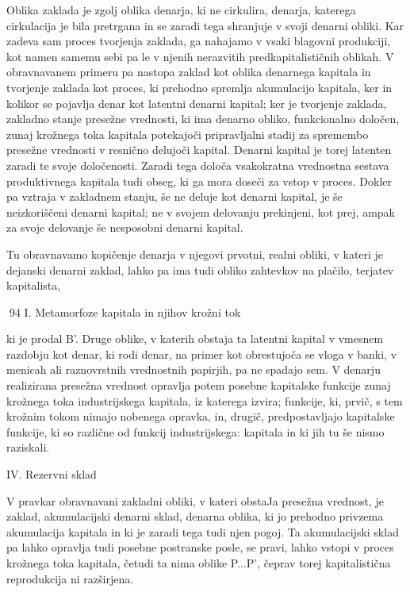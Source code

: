 \documentclass[kapital_02.tex]{subfiles}
\begin{document}
Oblika zaklada je zgolj oblika denarja, ki ne cirkulira, denarja, katerega cirkulacija je bila pretrgana in se zaradi tega shranjuje v svoji denarni obliki. Kar zadeva sam proces tvorjenja zaklada, ga nahajamo v vsaki blagovni produkciji, kot namen samemu sebi pa le v njenih nerazvitih predkapitalističnih oblikah. V obravnavanem primeru pa nastopa zaklad kot oblika denarnega kapitala in tvorjenje zaklada kot proces, ki prehodno spremlja akumulacijo kapitala, ker in kolikor se pojavlja denar kot latentni denarni kapital; ker je tvorjenje zaklada, zakladno stanje presežne vrednosti, ki ima denarno obliko, funkcionalno določen, zunaj krožnega toka kapitala potekajoči pripravljalni stadij za spremembo presežne vrednosti v resnično delujoči kapital. Denarni kapital je torej latenten zaradi te svoje določenosti. Zaradi tega določa vsakokratna vrednostna sestava produktivnega kapitala tudi obseg, ki ga mora doseči za vstop v proces. Dokler pa vztraja v zakladnem stanju, še ne deluje kot denarni kapital, je še neizkoriščeni denarni kapital; ne v svojem delovanju prekinjeni, kot prej, ampak za svoje delovanje še nesposobni denarni kapital.

Tu obravnavamo kopičenje denarja v njegovi prvotni, realni obliki, v kateri je dejanski denarni zaklad, lahko pa ima tudi obliko zahtevkov na plačilo, terjatev kapitalista,



94 I. Metamorfoze kapitala in njihov krožni tok



 ki je prodal B'. Druge oblike, v katerih obstaja ta latentni kapital v vmesnem razdobju kot denar, ki rodi denar, na primer kot obrestujoča se vloga v banki, v menicah ali raznovrstnih vrednostnih papirjih, pa ne spadajo sem. V denarju realizirana presežna vrednost opravlja potem posebne kapitalske funkcije zunaj krožnega toka industrijskega kapitala, iz katerega izvira; funkcije, ki, prvič, s tem krožnim tokom nimajo nobenega opravka, in, drugič, predpostavljajo kapitalske funkcije, ki so različne od funkcij industrijskega: kapitala in ki jih tu še nismo raziskali.

IV. Rezervni sklad

V pravkar obravnavani zakladni obliki, v kateri obstaJa presežna vrednost, je zaklad, akumulacijski denarni sklad, denarna oblika, ki jo prehodno privzema akumulacija kapitala in ki je zaradi tega tudi njen pogoj. Ta akumulacijski sklad pa lahko opravlja tudi posebne postranske posle, se pravi, lahko vstopi v proces krožnega toka kapitala, četudi ta nima oblike P...P', čeprav torej kapitalistična reprodukcija ni razširjena.
\end{document}
